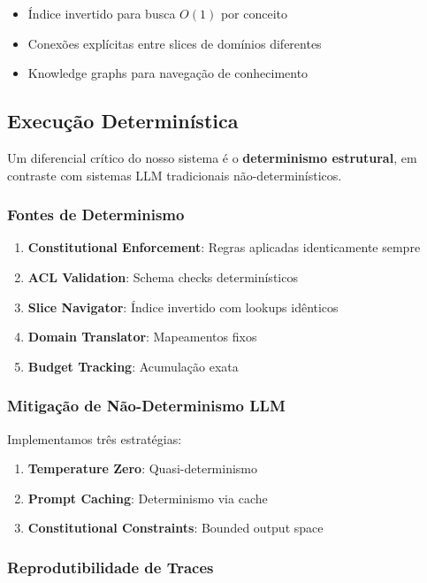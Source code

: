 \documentclass[11pt]{article}
\begin{document}
\begin{itemize}
    \item Índice invertido para busca $O(1)$ por conceito
    \item Conexões explícitas entre slices de domínios diferentes
    \item Knowledge graphs para navegação de conhecimento
\end{itemize}

\subsection{Execução Determinística}

Um diferencial crítico do nosso sistema é o \textbf{determinismo estrutural}, em contraste com sistemas LLM tradicionais não-determinísticos.

\subsubsection{Fontes de Determinismo}

\begin{enumerate}
    \item \textbf{Constitutional Enforcement}: Regras aplicadas identicamente sempre
    \item \textbf{ACL Validation}: Schema checks determinísticos
    \item \textbf{Slice Navigator}: Índice invertido com lookups idênticos
    \item \textbf{Domain Translator}: Mapeamentos fixos
    \item \textbf{Budget Tracking}: Acumulação exata
\end{enumerate}

\subsubsection{Mitigação de Não-Determinismo LLM}

Implementamos três estratégias:

\begin{enumerate}
    \item \textbf{Temperature Zero}: Quasi-determinismo
    \item \textbf{Prompt Caching}: Determinismo via cache
    \item \textbf{Constitutional Constraints}: Bounded output space
\end{enumerate}

\subsubsection{Reprodutibilidade de Traces}
\end{document}
